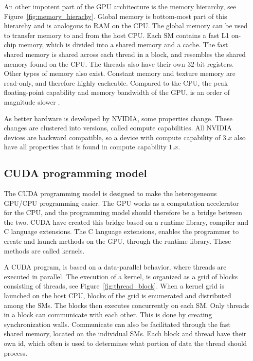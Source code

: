 An other impotent part of the GPU architecture is the memory hierarchy, see Figure~\ref{fig:memory_hierachy}. Global memory is bottom-most part of this hierarchy and is analogous to RAM on the CPU\@. The global memory can be used to transfer memory to and from the host CPU\@. Each SM contains a fast L1 on-chip memory, which is divided into a shared memory and a cache. The fast shared memory is shared across each thread in a block, and resembles the shared memory found on the CPU\@. The threads also have their own 32-bit registers. Other types of memory also exist. Constant memory and texture memory are read-only, and therefore highly cacheable. Compared to the CPU, the peak floating-point capability and memory bandwidth of the GPU, is an order of magnitude slower \citep{Liangcu}.

As better hardware is developed by NVIDIA, some properties change. These changes are clustered into versions, called compute capabilities. All NVIDIA devices are backward compatible, so a device with compute capability of $3.x$ also have all properties that is found in compute capability $1.x$.  

\subsection{CUDA programming model} %
\label{ssub:cuda_programming_model}

The CUDA programming model is designed to make the heterogeneous GPU/CPU programming easier. The GPU works as a computation accelerator for the CPU, and the programming model should therefore be a bridge between the two. CUDA have created this bridge based on a runtime library, compiler and C language extensions. The C language extensions, enables the programmer to create and launch methods on the GPU, through the runtime library. These methods are called kernels.

A CUDA program, is based on a data-parallel behavior, where threads are executed in parallel. The execution of a kernel, is organized as a grid of blocks consisting of threads, see Figure~\ref{fig:thread_block}. When a kernel grid is launched on the host CPU, blocks of the grid is enumerated and distributed among the SMs. The blocks then executes concurrently on each SM\@. Only threads in a block can communicate with each other. This is done by creating synchronization walls. Communicate can also be facilitated through the fast shared memory, located on the individual SMs\@. Each block and thread have their own id, which often is used to determines what portion of data the thread should process.


